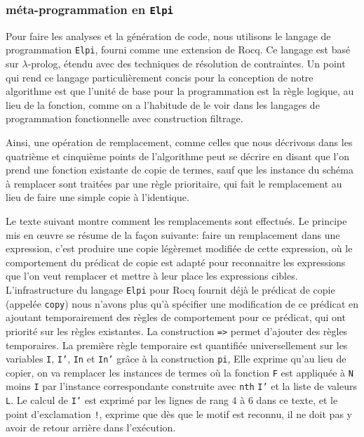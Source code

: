 \documentclass{jflart}
\begin{document}
\subsubsection{méta-programmation en \texttt{Elpi}}
Pour faire les analyses et la génération de code,
nous utilisons le langage de programmation
\texttt{Elpi}, fourni comme une extension de Rocq.  Ce langage est basé
sur \(\lambda\)-prolog, étendu avec des techniques de résolution de
contraintes.  Un point qui rend ce langage particulièrement concis
pour la conception de notre algorithme est que l'unité de base pour la
programmation est la règle logique, au lieu de la fonction, comme on a
l'habitude de le voir dans les langages de programmation fonctionnelle
avec construction filtrage.

Ainsi, une opération de remplacement, comme celles que nous décrivons
dans les quatrième et cinquième points de l'algorithme peut se décrire
en disant que l'on prend une fonction existante de copie de termes, sauf que les
instance du schéma à remplacer sont traitées par une règle prioritaire,
qui fait le remplacement au lieu de faire une simple copie à
l'identique.

Le texte suivant montre comment les remplacements sont effectués.  Le principe
mis en œuvre se résume de la façon suivante: faire un remplacement dans une
expression, c'est produire une copie légèremet modifiée de cette expression,
où le comportement du prédicat de copie est adapté pour reconnaitre les
expressions que l'on veut remplacer et mettre à leur place les expressions
cibles.  L'infrastructure du langage \texttt{Elpi} pour Rocq fournit déjà le
prédicat de copie (appelée \texttt{copy}) nous n'avons plus qu'à spécifier
une modification de ce prédicat en ajoutant temporairement
des règles de comportement pour ce prédicat, qui ont priorité sur les règles
existantes.  La
construction \texttt{=>} permet d'ajouter des règles temporaires.
La première règle temporaire est quantifiée universellement sur les variables
\texttt{I}, \texttt{I'}, \texttt{In} et \texttt{In'} grâce à la construction \texttt{pi},
Elle exprime qu'au lieu de copier, on va remplacer les instances de termes
où la fonction \texttt{F} est
appliquée à \texttt{N} moins \texttt{I} par l'instance
correspondante construite avec \texttt{nth} \texttt{I'} et la liste de
valeurs
\texttt{L}.  Le calcul de \texttt{I'} est exprimé par les lignes de rang 4 à 6 dans
ce texte, et le point d'exclamation \texttt{!}, exprime que dès que le
motif est reconnu, il ne doit pas y avoir de retour arrière dans l'exécution.
\end{document}
